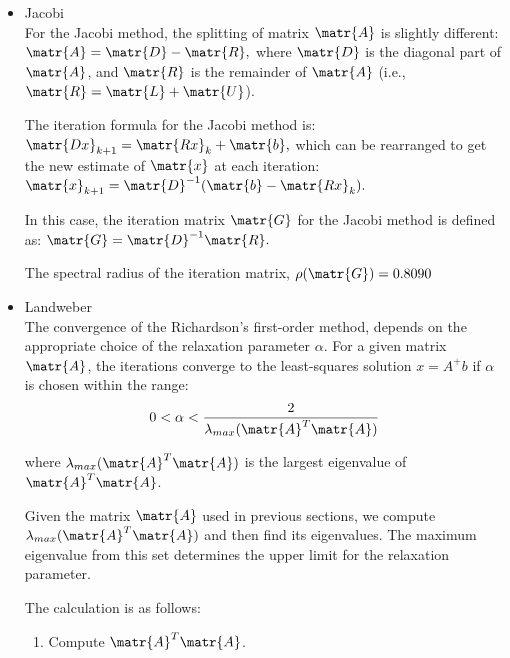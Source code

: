 \begin{itemize}
    The matrix $ \matr{A} $ is split as $ \matr{A} = \matr{D} - \matr{L} - \matr{U} $, and the SOR iteration matrix $ \matr{G}$ is defined as:
    $$ \matr{G}  = (\matr{D} - \omega \matr{L})^{-1}[(1-\omega)\matr{D} + \omega \matr{U}]. $$

  \item Jacobi \\
  
    For the Jacobi method, the splitting of matrix $ \matr{A} $ is slightly different:
    $ \matr{A} = \matr{D} - \matr{R}, $
    where $ \matr{D} $ is the diagonal part of $ \matr{A} $, and $ \matr{R} $ is the remainder of $ \matr{A} $ (i.e., $ \matr{R} = \matr{L} + \matr{U} $).

    The iteration formula for the Jacobi method is:
    $ \matr{Dx}_{k+1} = \matr{Rx}_k + \matr{b}, $
    which can be rearranged to get the new estimate of $ \matr{x} $ at each iteration:
    $ \matr{x}_{k+1} = \matr{D}^{-1}(\matr{b} - \matr{Rx}_k). $

    In this case, the iteration matrix $ \matr{G} $ for the Jacobi method is defined as:
    $ \matr{G} = \matr{D}^{-1}\matr{R}. $

    The spectral radius of the iteration matrix, $ \rho(\matr{G}) = 0.8090$

  \item Landweber \\
  
  The convergence of the Richardson's first-order method, depends on the appropriate choice of the relaxation parameter \( \alpha \). 
  For a given matrix $\matr{A}$, the iterations converge to the least-squares solution \( x = A^+b \) if \( \alpha \) is chosen within the range:
  \begin{equation*}
    0 < \alpha < \frac{2}{\lambda_{max}(\matr{A}^T\matr{A})}
  \end{equation*}

  where  $\lambda_{max}(\matr{A}^T\matr{A})$ is the largest eigenvalue of $ \matr{A}^T\matr{A} $.

  Given the matrix $\matr{A}$ used in previous sections, we compute $\lambda_{max}(\matr{A}^T\matr{A})$ and then find its eigenvalues. 
  The maximum eigenvalue from this set determines the upper limit for the relaxation parameter. 
  
  The calculation is as follows:
  \begin{enumerate}
      \item Compute $ \matr{A}^T\matr{A} $.
      

\end{enumerate}
\end{itemize}
